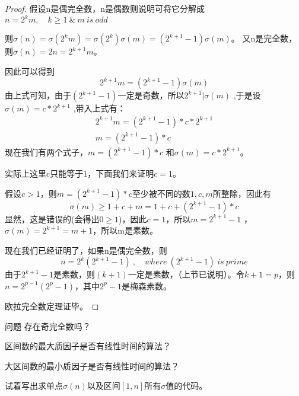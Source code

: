 \begin{proof}
	假设n是偶完全数，n是偶数则说明可将它分解成$n=2^km,\quad k\ge 1 \ \&\ m\ is\ odd$
	
	则$\sigma(n)=\sigma(2^km)=\sigma(2^k)\sigma(m)=(2^{k+1}-1)\sigma(m)$。
	又n是完全数，则$\sigma(n)=2n=2^{k+1}m$。
	
	因此可以得到
	$$
	2^{k+1}m=(2^{k+1}-1)\sigma(m)
	$$
	由上式可知，由于$(2^{k+1}-1)$一定是奇数，所以$2^{k+1}| \sigma(m)$ ,于是设$\sigma(m)=c*2^{k+1}$ ,带入上式有：
	\begin{align*}
	2^{k+1}m=(2^{k+1}-1)*c*2^{k+1} \\
	m=(2^{k+1}-1)*c
	\end{align*}
	现在我们有两个式子，$m=(2^{k+1}-1)*c$ 和$\sigma(m)=c*2^{k+1}$。
	
	实际上这里c只能等于1，下面我们来证明$c=1$。
	
	假设$c>1$，则$m=(2^{k+1}-1)*c$至少被不同的数$1,c,m$所整除，因此有
	$$
	\sigma(m)\ge 1+c+m=1+c+(2^{k+1}-1)*c
	$$
	显然，这是错误的(会得出$0\ge 1$)，因此$c=1$，所以$m=2^{k+1}-1$  ，  $\sigma(m)=2^{k+1}=m+1$，所以m是素数。
	
	现在我们已经证明了，如果n是偶完全数，则
	$$
	n=2^k(2^{k+1}-1)\ ,\quad where \ (2^{k+1}-1)\ is \ prime
	$$
	由于$2^{k+1}-1$是素数，则$(k+1)$一定是素数，（上节已说明）。令$k+1=p$，则$n=2^{p-1}(2^p-1)$，其中$2^p-1$是梅森素数。
	
	欧拉完全数定理证毕。
\end{proof}

\vbox{}

\begin{custom}{问题}
	存在奇完全数吗？
\end{custom}






\vbox{}


\begin{problemset}
	\item 区间数的最大质因子是否有线性时间的算法？
	\item 大区间数的最小质因子是否有线性时间的算法？
	\item 试着写出求单点$\sigma(n)$以及区间$[1,n]$所有$\sigma$值的代码。
\end{problemset}